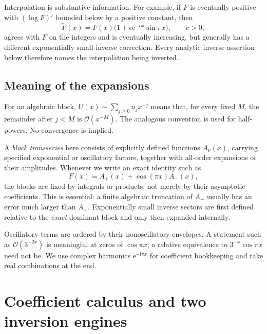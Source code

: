 \documentclass[11pt,a4paper]{article}
\theoremstyle{definition}
\theoremstyle{remark}
\newcommand{\ee}{\mathrm e}
\newcommand{\ii}{\mathrm i}
\newcommand{\OO}{\mathcal O}
\numberwithin{equation}{section}
\begin{document}
Interpolation is substantive information. For example, if $F$ is eventually positive with $(\log F)'$ bounded below by a positive constant, then
\begin{equation}
 \widetilde F(x)=F(x)\bigl(1+\epsilon\ee^{-cx}\sin\pi x\bigr),\qquad c>0,
 \label{eq:ambiguity}
\end{equation}
agrees with $F$ on the integers and is eventually increasing, but generally has a different exponentially small inverse correction. Every analytic inverse assertion below therefore names the interpolation being inverted.

\subsection{Meaning of the expansions}
For an algebraic block, $U(x)\sim\sum_{j\ge0}u_jx^{-j}$ means that, for every fixed $M$, the remainder after $j<M$ is $\OO(x^{-M})$. The analogous convention is used for half-powers. No convergence is implied.

A \emph{block transseries} here consists of explicitly defined functions $A_\nu(x)$, carrying specified exponential or oscillatory factors, together with all-order expansions of their amplitudes. Whenever we write an exact identity such as
\[
 F(x)=A_+(x)+\cos(\pi x)A_-(x),
\]
the blocks are fixed by integrals or products, not merely by their asymptotic coefficients. This is essential: a finite algebraic truncation of $A_+$ usually has an error much larger than $A_-$. Exponentially small inverse sectors are first defined relative to the \emph{exact} dominant block and only then expanded internally.

Oscillatory terms are ordered by their nonoscillatory envelopes. A statement such as $\OO(3^{-2x})$ is meaningful at zeros of $\cos\pi x$; a relative equivalence to $3^{-x}\cos\pi x$ need not be. We use complex harmonics $\ee^{\pm\ii\pi x}$ for coefficient bookkeeping and take real combinations at the end.

\section{Coefficient calculus and two inversion engines}
\label{sec:engines}
\end{document}
